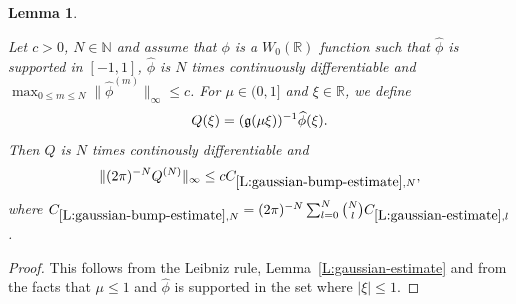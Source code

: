 \documentclass[12pt,reqno]{amsart}
\theoremstyle{plain}
\newtheorem{lemma}[theorem]{Lemma}
\numberwithin{equation}{section}
\theoremstyle{remark}
\newcommand{\uses}[1]{}
\newcommand{\usesdefs}[1]{}
\newcommand{\leanok}{}
\newcommand{\lean}[1]{}
\newcommand{\R}{{\mathbb R}}
\begin{document}
\begin{lemma}\label{L:gaussian-bump-estimate}\uses{L:gaussian-estimate}\usesdefs{gaussian,auto:Wiener-space-definition}
\lean{Auto.gaussianBumpEstimate}
\leanok
Let $c>0$, $N \in \mathbb N$ and assume that $\phi$ is a $W_0(\R)$ function such that $\widehat{\phi}$ is supported in $[-1,1]$, $\widehat{\phi}$ is $N$ times continuously differentiable and $\max_{0\leq m \leq N} \|\widehat{\phi}^{(m)}\|_{\infty} \leq c$.
For $\mu \in (0,1]$ and $\xi \in \R$, we define
\begin{equation}\label{auto:Gaussian-bump-quotient}
Q(\xi)=(\mathfrak{g}(\mu\xi))^{-1}\widehat{\phi}(\xi).
\end{equation}
Then $Q$ is $N$ times continously differentiable and
\begin{equation}\label{E:estimate-Q}
\|(2\pi)^{-N}Q^{(N)}\|_{\infty} \leq c C_{\ref{L:gaussian-bump-estimate},N},
\end{equation}
where $C_{\ref{L:gaussian-bump-estimate},N}= (2\pi)^{-N}\sum_{l=0}^N \binom{N}{l} C_{\ref{L:gaussian-estimate},l}$.
\end{lemma}

\begin{proof}

This follows from the Leibniz rule, Lemma~\ref{L:gaussian-estimate} and from the facts that $\mu \leq 1$ and $\widehat{\phi}$ is supported in the set where $|\xi|\leq 1$.
\end{proof}
\end{document}
